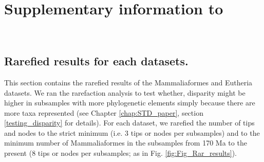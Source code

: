 \chapter{Supplementary information to }
\label{chap:Appendix_STD}

\bigskip
\medskip
\begin{center}

 \\
\bigskip
\end{center}

\section{Rarefied results for each datasets.}
This section contains the rarefied results of the Mammaliaformes and Eutheria datasets.
We ran the rarefaction analysis to test whether, disparity might be higher in subsamples with more phylogenetic elements simply because there are more taxa represented (see Chapter \ref{chap:STD_paper}, section \ref{testing_disparity} for details).
For each dataset, we rarefied the number of tips and nodes to the strict minimum (i.e. 3 tips or nodes per subsamples) and to the minimum number of Mammaliaformes in the subsamples from 170 Ma to the present (8 tips or nodes per subsamples; as in Fig. \ref{fig:Fig_Rar_results}).

